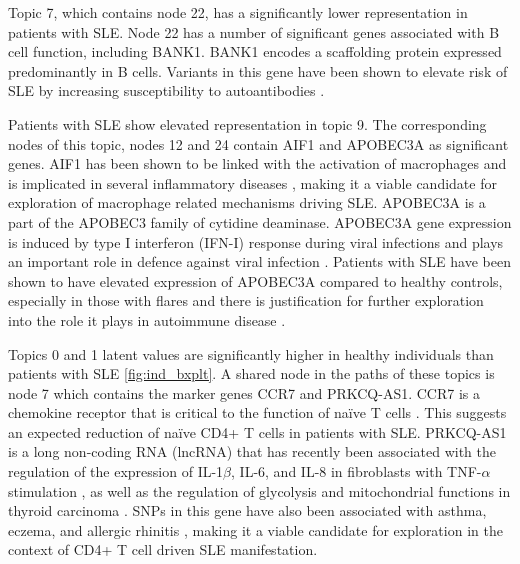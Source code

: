 Topic 7, which contains node 22, has a significantly lower representation in patients with SLE. Node 22 has a number of significant genes associated with B cell function, including BANK1. BANK1 encodes a scaffolding protein expressed predominantly in B cells. Variants in this gene have been shown to elevate risk of SLE by increasing susceptibility to autoantibodies \cite{dam2016bank1}.

Patients with SLE show elevated representation in topic 9. The corresponding nodes of this topic, nodes 12 and 24 contain AIF1 and APOBEC3A as significant genes. AIF1 has been shown to be linked with the activation of macrophages and is implicated in several inflammatory diseases \cite{de2023aif1}, making it a viable candidate for exploration of macrophage related mechanisms driving SLE. APOBEC3A is a part of the APOBEC3 family of cytidine deaminase. APOBEC3A gene expression is induced by type I interferon (IFN-I) response during viral infections and plays an important role in defence against viral infection \cite{taura2022apobec3a}. Patients with SLE have been shown to have elevated expression of APOBEC3A compared to healthy controls, especially in those with flares \cite{perez2021sustained} and there is justification for further exploration into the role it plays in autoimmune disease \cite{liu2023underexplored}.

Topics 0 and 1 latent values are significantly higher in healthy individuals than patients with SLE \ref{fig:ind_bxplt}. A shared node in the paths of these topics is node 7 which contains the marker genes CCR7 and PRKCQ-AS1. CCR7 is a chemokine receptor that is critical to the function of naïve T cells \cite{britschgi2008dynamic}. This suggests an expected reduction of naïve CD4+ T cells in patients with SLE. PRKCQ-AS1 is a long non-coding RNA (lncRNA) that has recently been associated with the regulation of the expression of IL-1$\beta$, IL-6, and IL-8 in fibroblasts with TNF-$\alpha$ stimulation \cite{zhao2023role}, as well as the regulation of glycolysis and mitochondrial functions in thyroid carcinoma \cite{zhang2023fasting}. SNPs in this gene have also been associated with asthma, eczema, and allergic rhinitis \cite{shi2023characterization}, making it a viable candidate for exploration in the context of CD4+ T cell driven SLE manifestation. 




